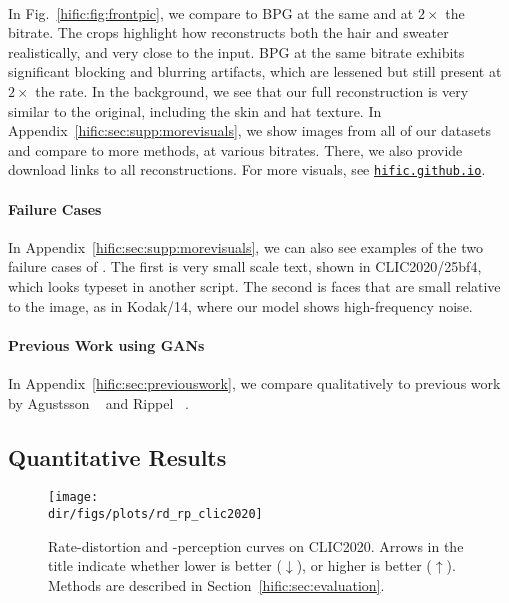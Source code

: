 \paragraph{\name}
In Fig.~\ref{hific:fig:frontpic}, we compare \enamelo 
to BPG at the same and at $2{\times}$ the bitrate. 
The crops highlight how \ename reconstructs both the hair and sweater realistically, and very close to the input. BPG at the same bitrate exhibits significant blocking and blurring artifacts, which are lessened but still present at $2{\times}$ the rate. 
In the background, we see that our full reconstruction is very similar to the original, including the skin and hat texture. 
In Appendix~\ref{hific:sec:supp:morevisuals}, we show images from all of our datasets and compare to more methods, at various bitrates. There, we also provide download links to all reconstructions. For more visuals, see \href{https://hific.github.io}{\texttt{hific.github.io}}.

\paragraph{Failure Cases}
In Appendix~\ref{hific:sec:supp:morevisuals}, we can also see examples of the two failure cases of \ename.
The first is very small scale text, shown in CLIC2020/25bf4, which looks typeset in another script. The second is faces that are small relative to the image, as in Kodak/14, where our \enamelo model shows high-frequency noise.

\paragraph{Previous Work using GANs} In Appendix~\ref{hific:sec:previouswork}, we compare qualitatively to previous work by Agustsson \etal~\cite{agustsson2019extreme} and Rippel \etal~\cite{rippel17a}.


\subsection{Quantitative Results} \label{hific:sec:results:quant}

\begin{figure}
    \centering
    \texttt{[image: \\dir/figs/plots/rd\_rp\_clic2020]}
    \caption{Rate-distortion and -perception curves on CLIC2020. Arrows in the title indicate whether lower is better ($\downarrow$), or higher is better ($\uparrow$). Methods are described in Section~\ref{hific:sec:evaluation}.} 
    \label{hific:fig:rd_rp}
\end{figure}


